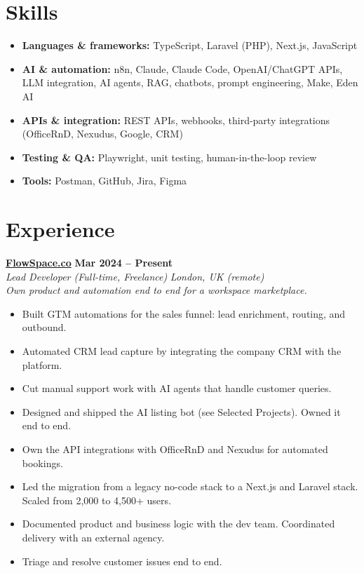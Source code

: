 \documentclass[a4paper,10pt]{article}
\newcommand{\role}[4]{%
 \textbf{#1} \hfill \textbf{#2}\\[1pt]%
 \textit{#3} \hfill \textit{#4}\\[2pt]%
}
\begin{document}
\section{Skills}
\begin{itemize}
 \item \textbf{Languages \& frameworks:} TypeScript, Laravel (PHP), Next.js, JavaScript
 \item \textbf{AI \& automation:} n8n, Claude, Claude Code, OpenAI/ChatGPT APIs, LLM integration, AI agents, RAG, chatbots, prompt engineering, Make, Eden AI
 \item \textbf{APIs \& integration:} REST APIs, webhooks, third-party integrations (OfficeRnD, Nexudus, Google, CRM)
 \item \textbf{Testing \& QA:} Playwright, unit testing, human-in-the-loop review
 \item \textbf{Tools:} Postman, GitHub, Jira, Figma
\end{itemize}

\section{Experience}

\role{\href{https://flowspace.co}{FlowSpace.co}}{Mar 2024 -- Present}{Lead Developer (Full-time, Freelance)}{London, UK (remote)}
\textit{Own product and automation end to end for a workspace marketplace.}
\begin{itemize}
 \item Built GTM automations for the sales funnel: lead enrichment, routing, and outbound.
 \item Automated CRM lead capture by integrating the company CRM with the platform.
 \item Cut manual support work with AI agents that handle customer queries.
 \item Designed and shipped the AI listing bot (see Selected Projects). Owned it end to end.
 \item Own the API integrations with OfficeRnD and Nexudus for automated bookings.
 \item Led the migration from a legacy no-code stack to a Next.js and Laravel stack. Scaled from 2,000 to 4,500+ users.
 \item Documented product and business logic with the dev team. Coordinated delivery with an external agency.
 \item Triage and resolve customer issues end to end.
\end{itemize}
\end{document}
